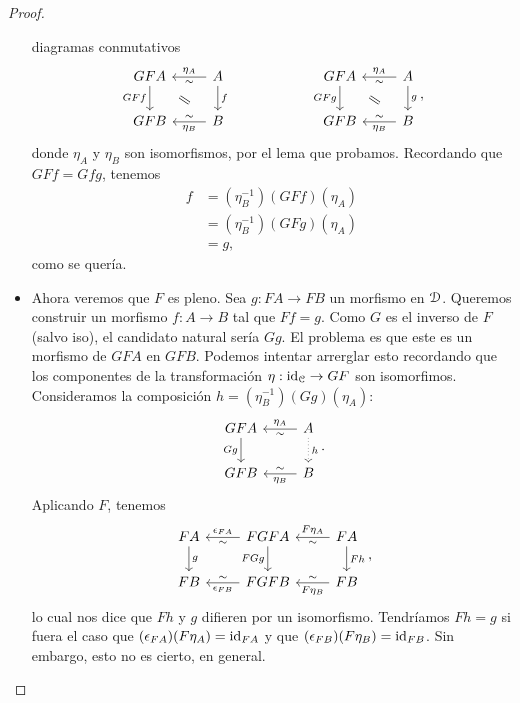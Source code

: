 \begin{proof}
\begin{itemize}
        diagramas conmutativos
        \[
        \begin{tikzcd}
            GFA \ar[d,"GFf"'] & A \ar[l,"\eta_A"',"\sim"] \ar[d,"f"] \\
            GFB & B \ar[l,"\eta_B","\sim"']
            \com{1-1}{2-2}
        \end{tikzcd}
        \hspace{20mm}
        \begin{tikzcd}
            GFA \ar[d,"GFg"'] & A \ar[l,"\eta_A"',"\sim"] \ar[d,"g"] \\
            GFB & B \ar[l,"\eta_B","\sim"']
            \com{1-1}{2-2}
        \end{tikzcd}
        ,\]
        donde $\eta_A$ y $\eta_B$ son isomorfismos, por el lema que probamos.
        Recordando que $GFf=Gfg$, tenemos
        \begin{align*}
            f
            &= (\eta_B^{-1})(GFf)(\eta_A) \\
            &= (\eta_B^{-1})(GFg)(\eta_A) \\
            &= g,
        \end{align*}
        como se quería.
        
        \item
        Ahora veremos que $F$ es pleno.
        Sea $g:FA\to FB$ un morfismo en $\cal D$.
        Queremos construir un morfismo $f:A\to B$ tal que $Ff=g$.
        Como $G$ es el inverso de $F$ (salvo iso),
        el candidato natural sería $Gg$.
        El problema es que este es un
        morfismo de $GFA$ en $GFB$.
        Podemos intentar arrerglar esto recordando que los componentes de
        la transformación $\eta:\id_{\cal C} \to GF$ son isomorfimos.
        Consideramos la composición $h=(\eta_B^{-1})(Gg)(\eta_A)$:
        \[
        \begin{tikzcd}
            GFA \ar[d,"Gg"'] & A \ar[l,"\eta_A"',"\sim"] 
            \ar[d,"h",dotted]\\
            GFB & B \ar[l,"\eta_B","\sim"']
        \end{tikzcd}
        .\]
        Aplicando $F$, tenemos
        \[
        \begin{tikzcd}
            FA \ar[d,"g"]
                & \ar[l,"\epsilon_{FA}"',"\sim"] FGFA \ar[d,"FGg"']
                & FA \ar[l,"F\eta_A"',"\sim"]  \ar[d,"Fh"]\\
            FB  & FGFB \ar[l,"\epsilon_{FB}","\sim"']
                & FB \ar[l,"F\eta_B","\sim"']
        \end{tikzcd}
        ,\]
        lo cual nos dice que $Fh$ y $g$ difieren por un isomorfismo.
        Tendríamos $Fh=g$ si fuera el caso que
        $(\epsilon_{FA})(F\eta_A)=\id_{FA}$
        y que $(\epsilon_{FB})(F\eta_B)=\id_{FB}$.
        Sin embargo, esto no es cierto, en general.
        

\end{itemize}
\end{proof}
